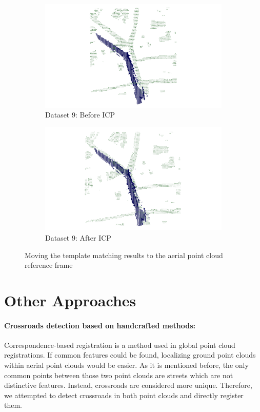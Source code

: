 \documentclass[11pt]{article}
\begin{document}
\begin{figure}[p]
        \begin{subfigure}{0.45\textwidth}
            \centering
            \includegraphics[width=\linewidth]{images/full/ply/5_6_1_before_icp}
            \caption{Dataset 9: Before ICP}
        \end{subfigure}
        \hfill
        \begin{subfigure}{0.45\textwidth}
            \centering
            \includegraphics[width=\linewidth]{images/full/ply/5_6_1_after_icp}
            \caption{Dataset 9: After ICP}
        \end{subfigure}

        \caption{Moving the template matching results to the aerial point cloud reference frame}
        \label{fig:icp_refine}
    \end{figure}
    \clearpage


    \section{Other Approaches}
    \paragraph{Crossroads detection based on handcrafted methods:}
    Correspondence-based registration is a method used in global point cloud registrations. If common features
    could be found, localizing ground point clouds within aerial point clouds would be easier. As it is mentioned
    before, the only common points between those two point clouds are streets which are not distinctive features.
    Instead, crossroads are considered more unique. Therefore, we attempted to detect crossroads in both
    point clouds and directly register them.
\end{document}
